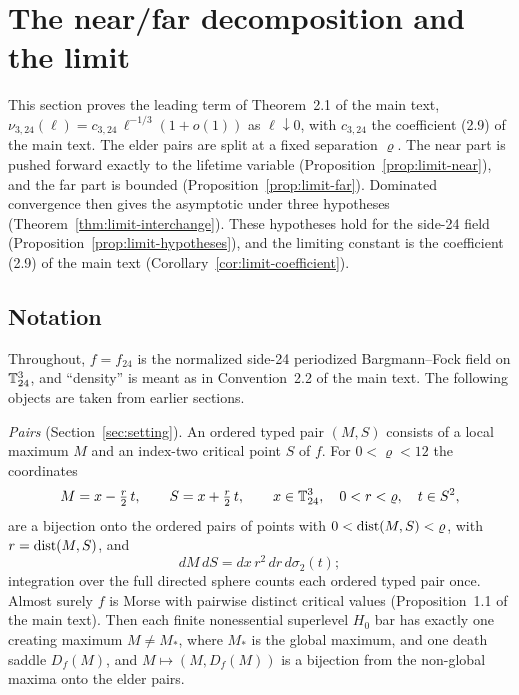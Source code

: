 \section{The near/far decomposition and the limit}\label{sec:limit}

This section proves the leading term of Theorem~2.1 of the main text, $\nu_{3,24}(\ell)=c_{3,24}\,\ell^{-1/3}(1+o(1))$ as $\ell\downarrow0$, with $c_{3,24}$ the coefficient (2.9) of the main text. The elder pairs are split at a fixed separation $\varrho$. The near part is pushed forward exactly to the lifetime variable (Proposition~\ref{prop:limit-near}), and the far part is bounded (Proposition~\ref{prop:limit-far}). Dominated convergence then gives the asymptotic under three hypotheses (Theorem~\ref{thm:limit-interchange}). These hypotheses hold for the side-24 field (Proposition~\ref{prop:limit-hypotheses}), and the limiting constant is the coefficient (2.9) of the main text (Corollary~\ref{cor:limit-coefficient}).

\subsection*{Notation}
Throughout, $f=f_{24}$ is the normalized side-24 periodized Bargmann--Fock field on $\mathbb T^3_{24}$, and ``density'' is meant as in Convention~2.2 of the main text. The following objects are taken from earlier sections.

\emph{Pairs} (Section~\ref{sec:setting}). An ordered typed pair $(M,S)$ consists of a local maximum $M$ and an index-two critical point $S$ of $f$. For $0<\varrho<12$ the coordinates
\[
M=x-\tfrac r2\,t,\qquad S=x+\tfrac r2\,t,\qquad x\in\mathbb T^3_{24},\quad 0<r<\varrho,\quad t\in S^2,
\]
are a bijection onto the ordered pairs of points with $0<\operatorname{dist}(M,S)<\varrho$, with $r=\operatorname{dist}(M,S)$, and
\begin{equation}\label{eq:limit-jacobian}
dM\,dS=dx\,r^2\,dr\,d\sigma_2(t);
\end{equation}
integration over the full directed sphere counts each ordered typed pair once. Almost surely $f$ is Morse with pairwise distinct critical values (Proposition~1.1 of the main text). Then each finite nonessential superlevel $H_0$ bar has exactly one creating maximum $M\ne M_*$, where $M_*$ is the global maximum, and one death saddle $D_f(M)$, and $M\mapsto(M,D_f(M))$ is a bijection from the non-global maxima onto the elder pairs.

